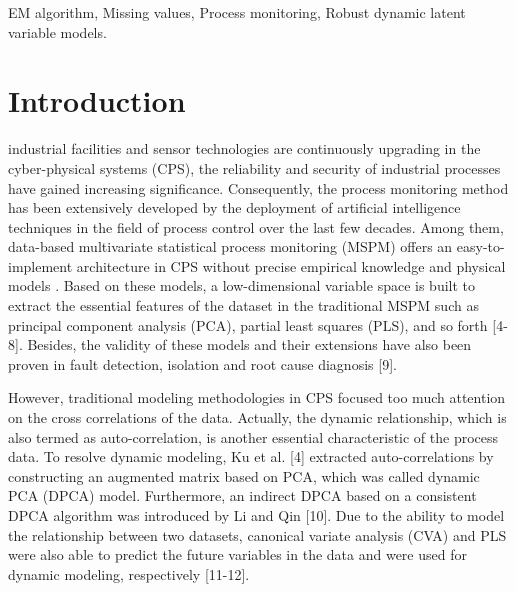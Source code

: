 \documentclass[journal]{IEEEtranTICPS}
\begin{document}
\begin{IEEEkeywords}
EM algorithm, Missing values, Process monitoring, Robust dynamic latent variable models.
\end{IEEEkeywords}

%
{}


\section{Introduction}

 industrial facilities and sensor technologies are continuously upgrading in the cyber-physical systems (CPS), the reliability and security of industrial processes have gained increasing significance. Consequently, the process monitoring method has been extensively developed by the deployment of artificial intelligence techniques in the field of process control over the last few decades.\cite{liu2023}  Among them, data-based multivariate statistical process monitoring (MSPM) offers an easy-to-implement architecture in CPS without precise empirical knowledge and physical models \cite{Ge2013, Bersimis2007, Qin2003}. Based on these models, a low-dimensional variable space is built to extract the essential features of the dataset in the traditional MSPM such as principal component analysis (PCA), partial least squares (PLS), and so forth \cite{KU1995}[4-8]. Besides, the validity of these models and their extensions have also been proven in fault detection, isolation and root cause diagnosis [9].

However, traditional modeling methodologies in CPS focused too much attention on the cross correlations of the data. Actually, the dynamic relationship, which is also termed as auto-correlation, is another essential characteristic of the process data. To resolve dynamic modeling, Ku et al. [4] extracted auto-correlations by constructing an augmented matrix based on PCA, which was called dynamic PCA (DPCA) model. Furthermore, an indirect DPCA based on a consistent DPCA algorithm was introduced by Li and Qin [10]. Due to the ability to model the relationship between two datasets, canonical variate analysis (CVA) and PLS were also able to predict the future variables in the data and were used for dynamic modeling, respectively [11-12]. 
\end{document}
